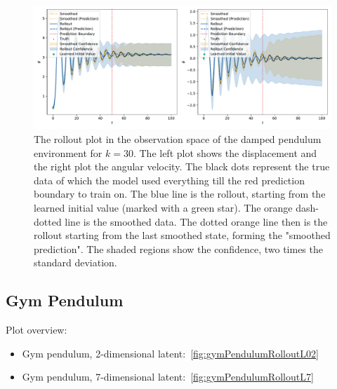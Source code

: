 		\begin{figure}
			\centering
			\includegraphics[width=\linewidth]{figures/results/pendulum-damped/run-latent-dim-30/rollout-observations-N0.pdf}
			\caption{The rollout plot in the observation space of the damped pendulum environment for \(k = 30\). The left plot shows the displacement and the right plot the angular velocity. The black dots represent the true data of which the model used everything till the red prediction boundary to train on. The blue line is the rollout, starting from the learned initial value (marked with a green star). The orange dash-dotted line is the smoothed data. The dotted orange line then is the rollout starting from the last smoothed state, forming the "smoothed prediction". The shaded regions show the confidence, \ie two times the standard deviation.}
			\label{fig:pendulumDampedRolloutL30}
		\end{figure}

	\subsection{Gym Pendulum}
		Plot overview:
		\begin{itemize}
			\item Gym pendulum, 2-dimensional latent:~\autoref{fig:gymPendulumRolloutL02}
			\item Gym pendulum, 7-dimensional latent:~\autoref{fig:gymPendulumRolloutL7}
		\end{itemize}


